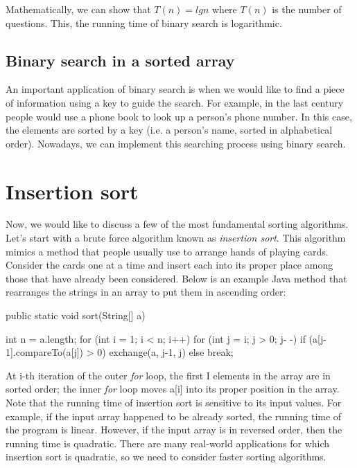  
 Mathematically, we can show that $T(n) = lg n$ where $T(n)$ is the number of questions. This, the running time of binary search is logarithmic.

\subsection{Binary search in a sorted array}
An important application of binary search is when we would like to find a piece of information using a key to guide the search. For example, in the last century people would use a phone book to look up a person’s phone number. In this case, the elements are sorted by a key (i.e. a person’s name, sorted in alphabetical order). Nowadays, we can implement this searching process using binary search.



\section{Insertion sort}

Now, we would like to discuss a few of the most fundamental sorting algorithms. 
Let’s start with a brute force algorithm known as \textit{insertion sort}. This algorithm mimics a method that people usually use to arrange hands of playing cards. Consider the cards one at a time and insert each into its proper place among those that have already been considered. Below is an example Java method that rearranges the strings in an array to put them in ascending order:

\begin{code}
public static void sort(String[] a)
{
	int n = a.length;
	for (int i = 1; i < n; i++)
		for (int j = i; j > 0; j- -)
			if (a[j-1].compareTo(a[j]) > 0)
				exchange(a, j-1, j)
			else break;

}
 
\end{code}
 
 
 At i-th iteration of the outer \textit{for} loop, the first I elements in the array are in sorted order; the inner \textit{for} loop moves a[i] into its proper position in the array. Note that the running time of insertion sort is sensitive to its input values. For example, if the input array happened to be already sorted, the running time of the program is linear. However, if the input array is in reversed order, then the running time is quadratic. There are many real-world applications for which insertion sort is quadratic, so we need to consider faster sorting algorithms.

